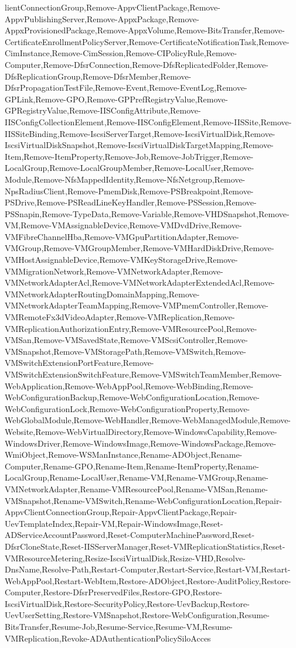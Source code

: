 {{lientConnectionGroup,Remove-AppvClientPackage,Remove-AppvPublishingServer,Remove-AppxPackage,Remove-AppxProvisionedPackage,Remove-AppxVolume,Remove-BitsTransfer,Remove-CertificateEnrollmentPolicyServer,Remove-CertificateNotificationTask,Remove-CimInstance,Remove-CimSession,Remove-CIPolicyRule,Remove-Computer,Remove-DfsrConnection,Remove-DfsReplicatedFolder,Remove-DfsReplicationGroup,Remove-DfsrMember,Remove-DfsrPropagationTestFile,Remove-Event,Remove-EventLog,Remove-GPLink,Remove-GPO,Remove-GPPrefRegistryValue,Remove-GPRegistryValue,Remove-IISConfigAttribute,Remove-IISConfigCollectionElement,Remove-IISConfigElement,Remove-IISSite,Remove-IISSiteBinding,Remove-IscsiServerTarget,Remove-IscsiVirtualDisk,Remove-IscsiVirtualDiskSnapshot,Remove-IscsiVirtualDiskTargetMapping,Remove-Item,Remove-ItemProperty,Remove-Job,Remove-JobTrigger,Remove-LocalGroup,Remove-LocalGroupMember,Remove-LocalUser,Remove-Module,Remove-NfsMappedIdentity,Remove-NfsNetgroup,Remove-NpsRadiusClient,Remove-PmemDisk,Remove-PSBreakpoint,Remove-PSDrive,Remove-PSReadLineKeyHandler,Remove-PSSession,Remove-PSSnapin,Remove-TypeData,Remove-Variable,Remove-VHDSnapshot,Remove-VM,Remove-VMAssignableDevice,Remove-VMDvdDrive,Remove-VMFibreChannelHba,Remove-VMGpuPartitionAdapter,Remove-VMGroup,Remove-VMGroupMember,Remove-VMHardDiskDrive,Remove-VMHostAssignableDevice,Remove-VMKeyStorageDrive,Remove-VMMigrationNetwork,Remove-VMNetworkAdapter,Remove-VMNetworkAdapterAcl,Remove-VMNetworkAdapterExtendedAcl,Remove-VMNetworkAdapterRoutingDomainMapping,Remove-VMNetworkAdapterTeamMapping,Remove-VMPmemController,Remove-VMRemoteFx3dVideoAdapter,Remove-VMReplication,Remove-VMReplicationAuthorizationEntry,Remove-VMResourcePool,Remove-VMSan,Remove-VMSavedState,Remove-VMScsiController,Remove-VMSnapshot,Remove-VMStoragePath,Remove-VMSwitch,Remove-VMSwitchExtensionPortFeature,Remove-VMSwitchExtensionSwitchFeature,Remove-VMSwitchTeamMember,Remove-WebApplication,Remove-WebAppPool,Remove-WebBinding,Remove-WebConfigurationBackup,Remove-WebConfigurationLocation,Remove-WebConfigurationLock,Remove-WebConfigurationProperty,Remove-WebGlobalModule,Remove-WebHandler,Remove-WebManagedModule,Remove-Website,Remove-WebVirtualDirectory,Remove-WindowsCapability,Remove-WindowsDriver,Remove-WindowsImage,Remove-WindowsPackage,Remove-WmiObject,Remove-WSManInstance,Rename-ADObject,Rename-Computer,Rename-GPO,Rename-Item,Rename-ItemProperty,Rename-LocalGroup,Rename-LocalUser,Rename-VM,Rename-VMGroup,Rename-VMNetworkAdapter,Rename-VMResourcePool,Rename-VMSan,Rename-VMSnapshot,Rename-VMSwitch,Rename-WebConfigurationLocation,Repair-AppvClientConnectionGroup,Repair-AppvClientPackage,Repair-UevTemplateIndex,Repair-VM,Repair-WindowsImage,Reset-ADServiceAccountPassword,Reset-ComputerMachinePassword,Reset-DfsrCloneState,Reset-IISServerManager,Reset-VMReplicationStatistics,Reset-VMResourceMetering,Resize-IscsiVirtualDisk,Resize-VHD,Resolve-DnsName,Resolve-Path,Restart-Computer,Restart-Service,Restart-VM,Restart-WebAppPool,Restart-WebItem,Restore-ADObject,Restore-AuditPolicy,Restore-Computer,Restore-DfsrPreservedFiles,Restore-GPO,Restore-IscsiVirtualDisk,Restore-SecurityPolicy,Restore-UevBackup,Restore-UevUserSetting,Restore-VMSnapshot,Restore-WebConfiguration,Resume-BitsTransfer,Resume-Job,Resume-Service,Resume-VM,Resume-VMReplication,Revoke-ADAuthenticationPolicySiloAcces}}
